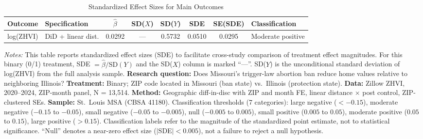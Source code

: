 \begin{table}[H]
\centering
\caption{Standardized Effect Sizes for Main Outcomes}
\label{tab:sde}
\begin{adjustbox}{max width=\textwidth}
\begin{tabular}{llcccccl}
\toprule
Outcome & Specification & $\hat{\beta}$ & SD($X$) & SD($Y$) & SDE & SE(SDE) & Classification \\
\midrule
log(ZHVI) & DiD + linear dist. & 0.0292 & --- & 0.5732 & 0.0510 & 0.0295 & Moderate positive \\
\bottomrule
\end{tabular}
\end{adjustbox}
\par\vspace{0.3em}
{\footnotesize \raggedright \emph{Notes:} This table reports standardized effect sizes (SDE) to facilitate cross-study comparison of treatment effect magnitudes. For this binary (0/1) treatment, SDE $= \hat{\beta} / \text{SD}(Y)$ and the SD($X$) column is marked ``---''. SD($Y$) is the unconditional standard deviation of log(ZHVI) from the full analysis sample. \textbf{Research question:} Does Missouri's trigger-law abortion ban reduce home values relative to neighboring Illinois? \textbf{Treatment:} Binary; ZIP code located in Missouri (ban state) vs.\ Illinois (protection state). \textbf{Data:} Zillow ZHVI, 2020--2024, ZIP-month panel, N = 13,514. \textbf{Method:} Geographic diff-in-disc with ZIP and month FE, linear distance $\times$ post control, ZIP-clustered SEs. \textbf{Sample:} St.\ Louis MSA (CBSA 41180). Classification thresholds (7 categories): large negative ($< -0.15$), moderate negative ($-0.15$ to $-0.05$), small negative ($-0.05$ to $-0.005$), null ($-0.005$ to $0.005$), small positive ($0.005$ to $0.05$), moderate positive ($0.05$ to $0.15$), large positive ($> 0.15$). Classification labels refer to the magnitude of the standardized point estimate, not to statistical significance. ``Null'' denotes a near-zero effect size ($|$SDE$| < 0.005$), not a failure to reject a null hypothesis.\par}
\end{table}
